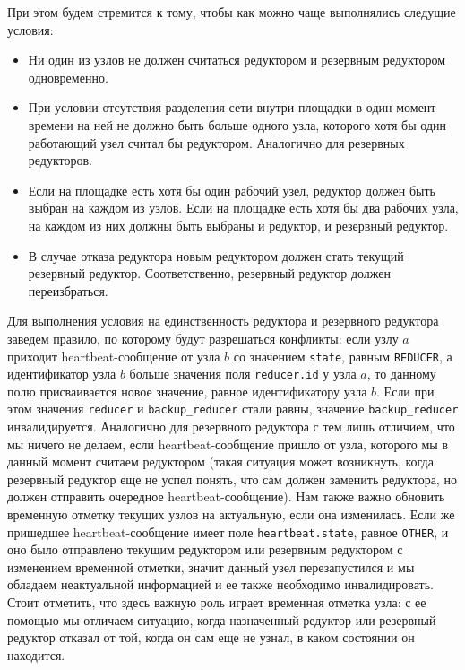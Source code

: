 \documentclass{article}
\theoremstyle{plain}
\theoremstyle{plain}
\theoremstyle{plain}
\theoremstyle{plain}
\theoremstyle{definition}
\theoremstyle{remark}
\theoremstyle{plain}
\begin{document}
При этом будем стремится к тому, чтобы как можно чаще выполнялись следущие условия:

\begin{itemize}
    \item Ни один из узлов не должен считаться редуктором и резервным редуктором одновременно.

    \item При условии отсутствия разделения сети \cite[с.~2]{CAP_Theorem} внутри площадки в один момент времени на ней не должно быть больше одного узла, которого хотя бы один работающий узел считал бы редуктором. Аналогично для резервных редукторов.
    
    \item Если на площадке есть хотя бы один рабочий узел, редуктор должен быть выбран на каждом из узлов. Если на площадке есть хотя бы два рабочих узла, на каждом из них должны быть выбраны и редуктор, и резервный редуктор.
    
    \item В случае отказа редуктора новым редуктором должен стать текущий резервный редуктор. Соответственно, резервный редуктор должен переизбраться.
\end{itemize}

Для выполнения условия на единственность редуктора и резервного редуктора заведем правило, по которому будут разрешаться конфликты: если узлу $a$ приходит heartbeat-сообщение от узла $b$ со значением \texttt{state}, равным \texttt{REDUCER}, а идентификатор узла $b$ больше значения поля \texttt{reducer.id} у узла $a$, то данному полю присваивается новое значение, равное идентификатору узла $b$. Если при этом значения \texttt{reducer} и \texttt{backup\_reducer} стали равны, значение \texttt{backup\_reducer} инвалидируется. Аналогично для резервного редуктора с тем лишь отличием, что мы ничего не делаем, если heartbeat-сообщение пришло от узла, которого мы в данный момент считаем редуктором (такая ситуация может возникнуть, когда резервный редуктор еще не успел понять, что сам должен заменить редуктора, но должен отправить очередное heartbeat-сообщение). Нам также важно обновить временную отметку текущих узлов на актуальную, если она изменилась. Если же пришедшее heartbeat-сообщение имеет поле \texttt{heartbeat.state}, равное \texttt{OTHER}, и оно было отправлено текущим редуктором или резервным редуктором с изменением временной отметки, значит данный узел перезапустился и мы обладаем неактуальной информацией и ее также необходимо инвалидировать. Стоит отметить, что здесь важную роль играет временная отметка узла: с ее помощью мы отличаем ситуацию, когда назначенный редуктор или резервный редуктор отказал от той, когда он сам еще не узнал, в каком состоянии он находится.
\end{document}
